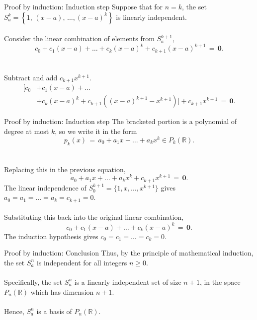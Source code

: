 \documentclass{beamer}
\begin{document}
        \begin{frame}{Proof by induction: Induction step}
                Suppose that for $n = k$, the set $S_a^k = \left\{1,\, (x - a),\, \dots, (x - a)^k\right\}$ is linearly independent. \\~\\
                \pause
                Consider the linear combination of elements from $S_a^{k + 1}$,
                \[
                        c_0 + c_1(x - a) + \dots + c_k(x - a)^k + c_{k + 1}(x - a)^{k + 1} \,=\, \mathbf{0}.
                \]\\~\\
                \pause Subtract and add $c_{k + 1}x^{k + 1}$.
                \begin{align*}
                        \Big[c_0 &+ c_1(x - a) + \dots  \\
                        &+ c_k(x - a)^k + c_{k + 1}\left((x - a)^{k + 1} - x^{k + 1}\right)\Big] + c_{k + 1}x^{k + 1} \,=\, \mathbf{0}.
                \end{align*}
        \end{frame}

        \begin{frame}{Proof by induction: Induction step}
                The bracketed portion is a polynomial of degree at most $k$, so we write it in the form
                \[
                        p_k(x) \,=\, a_0 + a_1x + \dots + a_kx^k \in P_k(\mathbb{R}).
                \]\\~\\
                \pause
                Replacing this in the previous equation,
                \[
                        a_0 + a_1x + \dots + a_kx^k + c_{k + 1}x^{k + 1} \,=\, \mathbf{0}.
                \]
                The linear independence of $S_0^{k + 1} = \{1, x, \dots, x^{k + 1}\}$ gives $a_0 = a_1 = \dots = a_k = c_{k + 1} = 0$. \\~\\
                \pause
                Substituting this back into the original linear combination,
                \[
                        c_0 + c_1(x - a) + \dots + c_k(x - a)^k \,=\, \mathbf{0}.
                \]
                The induction hypothesis gives $c_0 = c_1 = \dots = c_k = 0$.
        \end{frame}

        \begin{frame}{Proof by induction: Conclusion}
                Thus, by the principle of mathematical induction, the set $S_a^n$ is independent for all integers $n \geq 0$. \\~\\

                Specifically, the set $S_a^n$ is a linearly independent set of size $n + 1$, in the space $P_n(\mathbb{R})$ which has dimension
                $n + 1$. \\~\\

                Hence, $S_a^n$ is a basis of $P_n(\mathbb{R})$.
        \end{frame}
\end{document}

